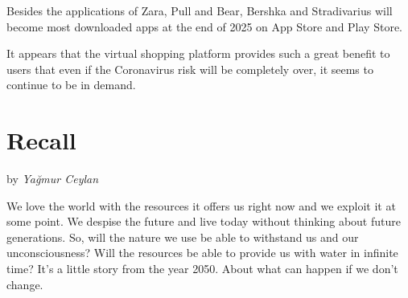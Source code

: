 \documentclass[]{book}
\begin{document}
Besides the applications of Zara, Pull and Bear, Bershka and Stradivarius will become most downloaded apps at the end of 2025 on App Store and Play Store.

It appears that the virtual shopping platform provides such a great benefit to users that even if the Coronavirus risk will be completely over, it seems to continue to be in demand.

\hypertarget{recall}{%
\chapter{Recall}\label{recall}}

by \emph{Yağmur Ceylan}

We love the world with the resources it offers us right now and we exploit it at some point. We despise the future and live today without thinking about future generations. So, will the nature we use be able to withstand us and our unconsciousness? Will the resources be able to provide us with water in infinite time? It's a little story from the year 2050. About what can happen if we don't change.
\end{document}
